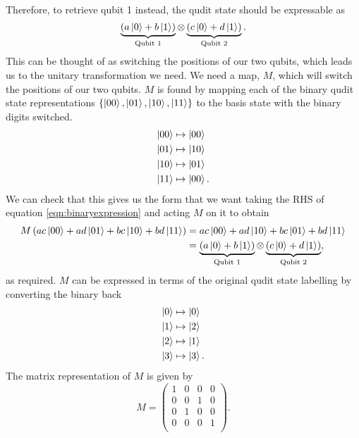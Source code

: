 Therefore, to retrieve qubit 1 instead, the qudit state should be expressable as
\begin{equation}
    \underbrace{\left(a\ket{0} + b\ket{1}\right)}_{\text{Qubit 1}} \otimes \underbrace{\left(c\ket{0} + d\ket{1}\right)}_{\text{Qubit 2}}.
\end{equation}
This can be thought of as switching the positions of our two qubits, which leads us to the unitary transformation we need.
We need a map, $M$, which will switch the positions of our two qubits.
$M$ is found by mapping each of the binary qudit state representations $\{\ket{00}, \ket{01}, \ket{10}, \ket{11}\}$ to the basis state with the binary digits switched.
\begin{align}
    \ket{00} &\mapsto \ket{00}\\
    \ket{01} &\mapsto \ket{10}\\
    \ket{10} &\mapsto \ket{01}\\
    \ket{11} &\mapsto \ket{00}.
\end{align}
We can check that this gives us the form that we want taking the RHS of equation \ref{eqn:binaryexpression} and acting $M$ on it to obtain
\begin{align}
    M\left(ac\ket{00} + ad\ket{01} + bc\ket{10} + bd\ket{11}\right) 
    &=  ac\ket{00} + ad\ket{10} + bc\ket{01} + bd\ket{11}\\
    &= \underbrace{\left(a\ket{0} + b\ket{1}\right)}_{\text{Qubit 1}} \otimes \underbrace{\left(c\ket{0} + d\ket{1}\right)}_{\text{Qubit 2}},
\end{align}
as required.
$M$ can be expressed in terms of the original qudit state labelling by converting the binary back
\begin{align}
    \ket{0} &\mapsto \ket{0}\\
    \ket{1} &\mapsto \ket{2}\\
    \ket{2} &\mapsto \ket{1}\\
    \ket{3} &\mapsto \ket{3}.
\end{align}
The matrix representation of $M$ is given by
\begin{equation}
    M = 
    \begin{pmatrix}
        1 & 0 & 0 & 0\\
        0 & 0 & 1 & 0\\
        0 & 1 & 0 & 0\\
        0 & 0 & 0 & 1\\
    \end{pmatrix}.
\end{equation}
